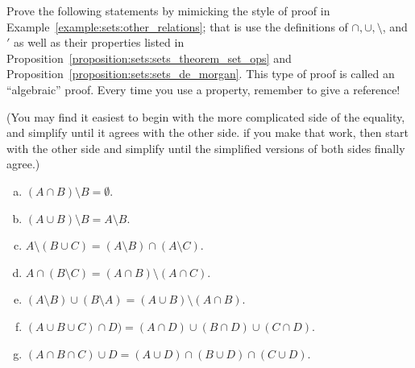  
 
 
 
 

 
 
\begin{exercise}{30}
Prove the following statements by mimicking the style of proof in Example~\ref{example:sets:other_relations}; that is use the definitions of $\cap, \cup, \setminus$, and $'$ as well as their properties listed in Proposition~\ref{proposition:sets:sets_theorem_set_ops} and  Proposition~\ref{proposition:sets:sets_de_morgan}. This type of proof is called an ``algebraic'' proof.  Every time you use a property, remember to give a reference!

(You may find it easiest to begin with the more complicated side of the equality, and  simplify until it agrees with the other side. if you make that work, then start with the other side and simplify until the simplified versions of both sides finally agree.)

\begin{enumerate}[(a)]
\item
$(A \cap B) \setminus B = \emptyset$.
\item
$(A \cup B) \setminus B = A \setminus B$.
\item
$A \setminus (B \cup C) = (A \setminus B) \cap (A \setminus C)$. 
\item
 $A \cap (B \setminus C) = (A \cap B) \setminus (A \cap C)$. 
\item
$(A \setminus B) \cup (B \setminus A) = (A \cup B) \setminus (A \cap B)$. 
\item
$(A \cup B \cup C) \cap D) = (A \cap D) \cup (B \cap D)\cup (C \cap D)$. 
\item
$(A \cap B \cap C) \cup D = (A \cup D) \cap (B \cup D)\cap (C \cup D)$. 
\end{enumerate}
\end{exercise}

